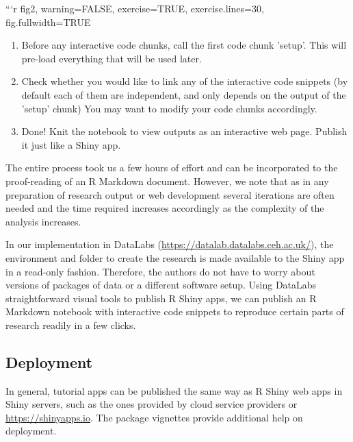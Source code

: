 \begin{example}
```{r fig2, warning=FALSE, exercise=TRUE, exercise.lines=30, fig.fullwidth=TRUE}
\end{example}

\begin{enumerate}
\def\labelenumi{\arabic{enumi}.}
\setcounter{enumi}{3}
\tightlist
\item
  Before any interactive code chunks, call the first code chunk 'setup'.
  This will pre-load everything that will be used later.
\item
  Check whether you would like to link any of the interactive code
  snippets (by default each of them are independent, and only depends on
  the output of the 'setup' chunk) You may want to modify your code
  chunks accordingly.
\item
  Done! Knit the notebook to view outputs as an interactive web page.
  Publish it just like a Shiny app.
\end{enumerate}

The entire process took us a few hours of effort and can be incorporated
to the proof-reading of an R Markdown document. However, we note that as
in any preparation of research output or web development several
iterations are often needed and the time required increases accordingly
as the complexity of the analysis increases.

In our implementation in DataLabs
(\url{https://datalab.datalabs.ceh.ac.uk/}), the environment and folder
to create the research is made available to the Shiny app in a read-only
fashion. Therefore, the authors do not have to worry about versions of
packages of data or a different software setup. Using DataLabs
straightforward visual tools to publish R Shiny apps, we can publish an
R Markdown notebook with interactive code snippets to reproduce certain
parts of research readily in a few clicks.

\hypertarget{deployment}{%
\subsection{Deployment}\label{deployment}}

In general,  tutorial apps can be published the same way
as R Shiny web apps in Shiny servers, such as the ones provided by cloud
service providers or \url{https://shinyapps.io}. The 
package vignettes provide additional help on deployment.

